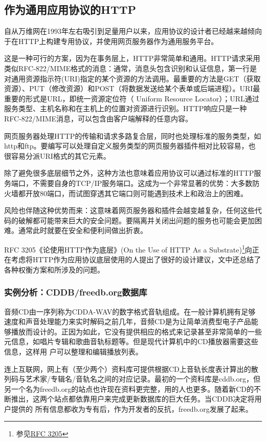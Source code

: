 \documentclass[12pt,oneside]{book}
\begin{document}
\subsection{作为通用应用协议的HTTP}
自从万维网在1993年左右吸引到足量用户以来，应用协议的设计者已经越来越倾向于在HTTP上构建专用协议，并使用网页服务器作为通用服务平台。

这是一种可行的方案，因为在事务层上，HTTP非常简单和通用。HTTP请求采用类似RFC-822/MIME格式的消息：通常，消息头包含识别和认证信息，第一行是对通用资源指示符(URI)指定的某个资源的方法调用。最重要的方法是GET（获取资源）、PUT（修改资源）和POST（将数据发送给某个表单或后端进程）。URI最重要的形式是URL，即统一资源定位符（ Uniform Resource Locator）；URL通过服务类型、主机名称和在主机上的位置对资源进行识别。HTTP响应只是一种RFC-822/MIME消息，可以包含由客户端解释的任意内容。

网页服务器处理HTTP的传输和请求多路复合层，同时也处理标准的服务类型，如http和ftp。要编写可以处理自定义服务类型的网页服务器插件相对比较容易，也很容易分派URI格式的其它元素。

除了避免很多底层细节之外，这种方法也意味着应用协议可以通过标准的HTTP服务端口，不需要自身的TCP/IP服务端口。这成为一个非常显著的优势：大多数防火墙都开放80端口，而试图穿透其它端口则可能遇到技术上和政治上的困难。

风险也伴随这种优势而来：这意味着网页服务器和插件会越变越复杂，任何这些代码的破解都可能带来巨大的安全问题。要隔离并关闭出问题的服务也可能会更加困难。通常此时就要在安全和便利间做出折衷。

RFC 3205《论使用HTTP作为底层》(On the Use of HTTP As a Substrate)\footnote{参见\href{http://www.faqs.org/rfcs/rfc3205.html}{RFC 3205}}向正在考虑将HTTP作为应用协议底层使用的人提出了很好的设计建议，文中还总结了各种权衡方案和所涉及的问题。

\subsubsection{实例分析：CDDB/freedb.org数据库}
音频CD由一序列称为CDDA-WAV的数字格式音轨组成。在一般计算机拥有足够速度和声音处理能力来实时解码之前几年，音频CD是为让简单消费型电子产品能够播放而设计的。正因为如此，它没有提供相应的格式来记录甚至非常简单的一些元信息，如唱片专辑和歌曲音轨标题等。但是现代计算机中的CD播放器需要这些信息，这样用
户可以整理和编辑播放列表。

连上互联网，网上有（至少两个）资料库可提供根据CD上音轨长度表计算出的散列码与艺术家/专辑名/音轨名之间的对应记录。最初的一个资料库是cddb.org，但另一个名为freedb.org的站点也许现在资料更完整，用的人也更多。随着新CD的不断推出，这两个站点都依靠用户来完成更新数据库的巨大任务。当CDDB决定将用户提供的
所有信息都收为专有后，作为开发者的反抗，freedb.org发展了起来。
\end{document}
